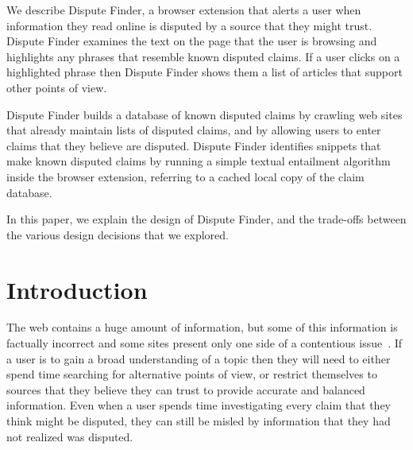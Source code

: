 \documentclass{www2010-accepted}
\newcommand{\todo}[1]{}
\begin{document}


\abstract

We describe Dispute Finder, a browser extension that alerts a user when information they read online is disputed by a source that they might trust. Dispute Finder examines the text on the page that the user is browsing and highlights any phrases that resemble known disputed claims. If a user clicks on a highlighted phrase then Dispute Finder shows them a list of articles that support other points of view.

Dispute Finder builds a database of known disputed claims by crawling web sites that already maintain lists of disputed claims, and by allowing users to enter claims that they believe are disputed. Dispute Finder identifies snippets that make known disputed claims by running a simple textual entailment algorithm inside the browser extension, referring to a cached local copy of the claim database.

In this paper, we explain the design of Dispute Finder, and the trade-offs between the various design decisions that we explored. 






\section{Introduction}

\todo{update screenshots}
\todo{should this be spun as about news, or information in general}
\todo{need to talk more about what we know about people}
 

The web contains a huge amount of information, but some of this information is factually incorrect and some sites present only one side of a contentious issue~\cite{Herman2002}. If a user is to gain a broad understanding of a topic then they will need to either spend time searching for alternative points of view, or restrict themselves to sources that they believe they can trust to provide accurate and balanced information. Even when a user spends time investigating every claim that they think might be disputed, they can still be misled by information that they had not realized was disputed.
\end{document}
